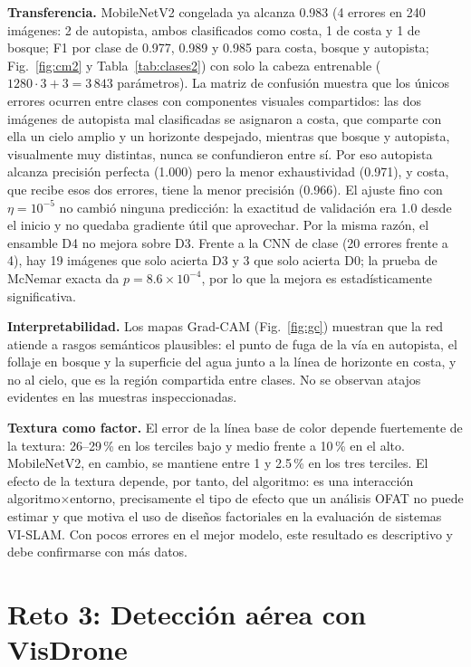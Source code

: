 \documentclass[conference]{IEEEtran}
\begin{document}
\textbf{Transferencia.} MobileNetV2 congelada ya alcanza 0.983 (4 errores en 240 imágenes: 2 de autopista, ambos clasificados como costa, 1 de costa y 1 de bosque; F1 por clase de 0.977, 0.989 y 0.985 para costa, bosque y autopista; Fig.~\ref{fig:cm2} y Tabla~\ref{tab:clases2}) con solo la cabeza entrenable ($1280\cdot3+3=3\,843$ parámetros). La matriz de confusión muestra que los únicos errores ocurren entre clases con componentes visuales compartidos: las dos imágenes de autopista mal clasificadas se asignaron a costa, que comparte con ella un cielo amplio y un horizonte despejado, mientras que bosque y autopista, visualmente muy distintas, nunca se confundieron entre sí. Por eso autopista alcanza precisión perfecta (1.000) pero la menor exhaustividad (0.971), y costa, que recibe esos dos errores, tiene la menor precisión (0.966). El ajuste fino con $\eta=10^{-5}$ no cambió ninguna predicción: la exactitud de validación era 1.0 desde el inicio y no quedaba gradiente útil que aprovechar. Por la misma razón, el ensamble D4 no mejora sobre D3. Frente a la CNN de clase (20 errores frente a 4), hay 19 imágenes que solo acierta D3 y 3 que solo acierta D0; la prueba de McNemar exacta da $p=8.6\times10^{-4}$, por lo que la mejora es estadísticamente significativa.

\textbf{Interpretabilidad.} Los mapas Grad-CAM \cite{selvaraju2017} (Fig.~\ref{fig:gc}) muestran que la red atiende a rasgos semánticos plausibles: el punto de fuga de la vía en autopista, el follaje en bosque y la superficie del agua junto a la línea de horizonte en costa, y no al cielo, que es la región compartida entre clases. No se observan atajos evidentes en las muestras inspeccionadas.

\textbf{Textura como factor.} El error de la línea base de color depende fuertemente de la textura: 26--29\,\% en los terciles bajo y medio frente a 10\,\% en el alto. MobileNetV2, en cambio, se mantiene entre 1 y 2.5\,\% en los tres terciles. El efecto de la textura depende, por tanto, del algoritmo: es una interacción algoritmo$\times$entorno, precisamente el tipo de efecto que un análisis OFAT no puede estimar y que motiva el uso de diseños factoriales en la evaluación de sistemas VI-SLAM. Con pocos errores en el mejor modelo, este resultado es descriptivo y debe confirmarse con más datos.

\section{Reto 3: Detección aérea con VisDrone}
\end{document}
